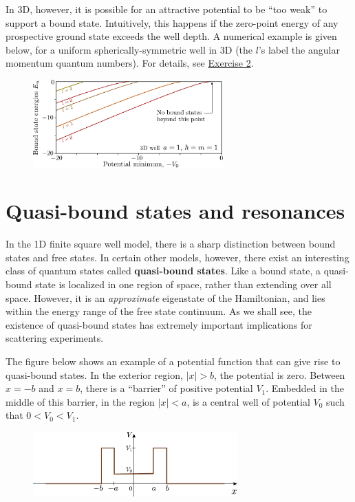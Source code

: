 \documentclass[pra,12pt]{revtex4}
\begin{document}
In 3D, however, it is possible for an attractive potential to be ``too
weak'' to support a bound state.  Intuitively, this happens if the
zero-point energy of any prospective ground state exceeds the well
depth.  A numerical example is given below, for a uniform
spherically-symmetric well in 3D (the $l$'s label the angular momentum
quantum numbers).  For details, see
\hyperref[ex:boundstate3d]{Exercise 2}.

\begin{figure}[h]
  \centering\includegraphics[width=0.65\textwidth]{boundstate3d}
\end{figure}

\section{Quasi-bound states and resonances}

In the 1D finite square well model, there is a sharp distinction
between bound states and free states.  In certain other models,
however, there exist an interesting class of quantum states called
\textbf{quasi-bound states}.  Like a bound state, a quasi-bound state
is localized in one region of space, rather than extending over all
space.  However, it is an \textit{approximate} eigenstate of the
Hamiltonian, and lies within the energy range of the free state
continuum.  As we shall see, the existence of quasi-bound states has
extremely important implications for scattering experiments.

The figure below shows an example of a potential function that can
give rise to quasi-bound states.  In the exterior region, $|x| > b$,
the potential is zero.  Between $x = -b$ and $x = b$, there is a
``barrier'' of positive potential $V_1$.  Embedded in the middle of
this barrier, in the region $|x| < a$, is a central well of potential
$V_0$ such that $0 < V_0 < V_1$.

\begin{figure}[h]
  \centering\includegraphics[width=0.7\textwidth]{resonancewell}
\end{figure}
\end{document}
